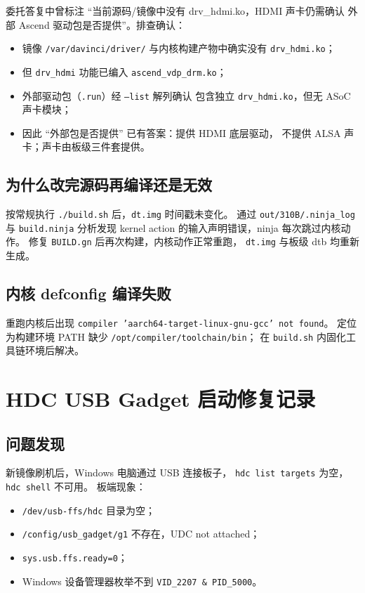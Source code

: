 委托答复中曾标注 ``当前源码/镜像中没有 drv\_hdmi.ko，HDMI 声卡仍需确认
外部 Ascend 驱动包是否提供''。排查确认：
\begin{itemize}
  \item 镜像 \texttt{/var/davinci/driver/} 与内核构建产物中确实没有
  \texttt{drv\_hdmi.ko}；
  \item 但 \texttt{drv\_hdmi} 功能已编入 \texttt{ascend\_vdp\_drm.ko}；
  \item 外部驱动包（\texttt{.run}）经 \texttt{--list} 解列确认
  包含独立 \texttt{drv\_hdmi.ko}，但无 ASoC 声卡模块；
  \item 因此 ``外部包是否提供'' 已有答案：提供 HDMI 底层驱动，
  不提供 ALSA 声卡；声卡由板级三件套提供。
\end{itemize}

\subsection{为什么改完源码再编译还是无效}

按常规执行 \texttt{./build.sh} 后，\texttt{dt.img} 时间戳未变化。
通过 \texttt{out/310B/.ninja\_log} 与 \texttt{build.ninja} 分析发现
kernel action 的输入声明错误，ninja 每次跳过内核动作。
修复 \texttt{BUILD.gn} 后再次构建，内核动作正常重跑，
\texttt{dt.img} 与板级 dtb 均重新生成。

\subsection{内核 defconfig 编译失败}

重跑内核后出现 \texttt{compiler 'aarch64-target-linux-gnu-gcc' not found}。
定位为构建环境 PATH 缺少 \texttt{/opt/compiler/toolchain/bin}；
在 \texttt{build.sh} 内固化工具链环境后解决。

\section{HDC USB Gadget 启动修复记录}

\subsection{问题发现}

新镜像刷机后，Windows 电脑通过 USB 连接板子，
\texttt{hdc list targets} 为空，\texttt{hdc shell} 不可用。
板端现象：
\begin{itemize}
  \item \texttt{/dev/usb-ffs/hdc} 目录为空；
  \item \texttt{/config/usb\_gadget/g1} 不存在，UDC not attached；
  \item \texttt{sys.usb.ffs.ready=0}；
  \item Windows 设备管理器枚举不到 \texttt{VID\_2207 \& PID\_5000}。
\end{itemize}

